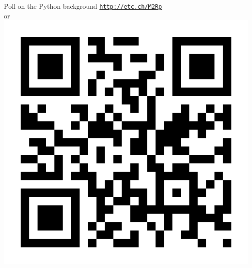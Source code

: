 
\begin{frame}{Poll on the Python background}
\centering 
\vskip 10pt
{\Large \href{http://etc.ch/M2Rp}{\textcolor{indigo(dye)}{\tt http://etc.ch/M2Rp}}}\\ 
or \\[10pt]
\includegraphics[height=0.4\columnwidth]{figures/intro/poll-python-background.png}
\end{frame}

